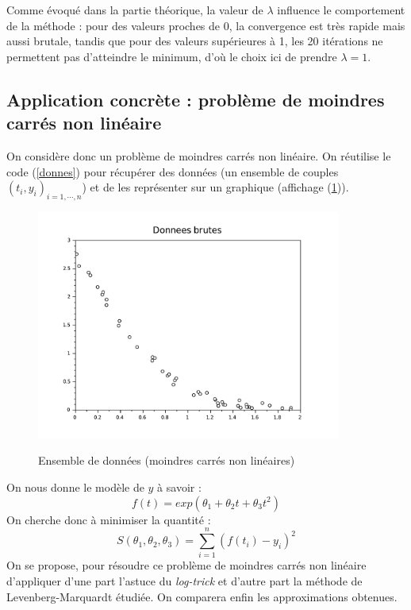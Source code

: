 \documentclass[a4paper,10pt]{report}
\begin{document}
Comme évoqué dans la partie théorique, la valeur de $\lambda$ influence le comportement de la méthode : pour des valeurs proches de 0, la convergence est très rapide mais aussi brutale, tandis que pour des valeurs supérieures à 1, les 20 itérations ne permettent pas d'atteindre le minimum, d'où le choix ici de prendre $\lambda=1$.

\newpage
\subsection{Application concrète : problème de moindres carrés non linéaire}
On considère donc un problème de moindres carrés non linéaire. On réutilise le code (\ref{donnes}) pour récupérer des données (un ensemble de couples $(t_i,y_i)_{i=1,\cdots,n}$) et de les représenter sur un graphique (affichage (\ref{donnes_graph2})).

\begin{figure}[H]
\centering
\caption{Ensemble de données (moindres carrés non linéaires)}
\includegraphics[width=10cm]{donnes_brutes2.pdf}
\label{donnes_graph2}
\end{figure}

On nous donne le modèle de $y$ à savoir :
\abovedisplayskip=0mm
\begin{displaymath}
f(t)=exp(\theta_1 + \theta_2t + \theta_3t^2)
\end{displaymath}
On cherche donc à minimiser la quantité :
\abovedisplayskip=0mm
\begin{displaymath}
S(\theta_1,\theta_2,\theta_3)=\sum \limits_{i=1}^n (f(t_i)-y_i)^2
\end{displaymath}
On se propose, pour résoudre ce problème de moindres carrés non linéaire d'appliquer d'une part l'astuce du \textit{log-trick} et d'autre part la méthode de Levenberg-Marquardt étudiée. On comparera enfin les approximations obtenues. \\
\end{document}
